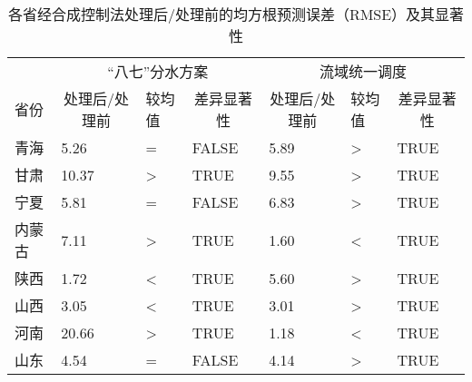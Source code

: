 
\begin{table}[!htbp]\footnotesize
	\centering
	\caption[合成控制法的安慰剂检验结果]{各省经合成控制法处理后/处理前的均方根预测误差（RMSE）及其显著性}
	\begin{tabularx}{\textwidth}{XXXXXXX}
	  \toprule
			& \multicolumn{3}{c}{``八七''分水方案} & \multicolumn{3}{c}{流域统一调度} \\
  \cmidrule{2-7}    省份  & \multicolumn{1}{c}{处理后/处理前} & 较均值 & \multicolumn{1}{c}{差异显著性} & \multicolumn{1}{c}{处理后/处理前} & 较均值   & \multicolumn{1}{c}{差异显著性} \\
	  \midrule
	  青海 & 5.26  & =     & FALSE & 5.89  & >     & TRUE \\
	  甘肃 & 10.37  & >     & TRUE  & 9.55  & >     & TRUE \\
	  宁夏 & 5.81  & =     & FALSE & 6.83  & >     & TRUE \\
	  内蒙古 & 7.11  & >     & TRUE  & 1.60  & <     & TRUE \\
	  陕西 & 1.72  & <     & TRUE  & 5.60  & >     & TRUE \\
	  山西 & 3.05  & <     & TRUE  & 3.01  & >     & TRUE \\
	  河南 & 20.66  & >     & TRUE  & 1.18  & <     & TRUE \\
	  山东 & 4.54  & =     & FALSE & 4.14  & >     & TRUE \\
	  \bottomrule
	  \end{tabularx}%
	\label{ch5:tab:RMSE}%
\end{table}%
